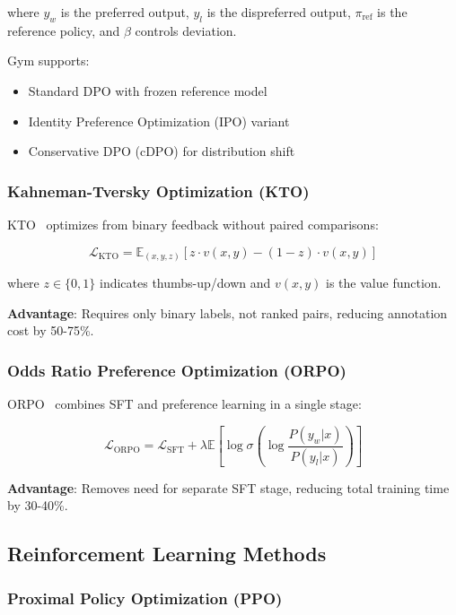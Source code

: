 where $y_w$ is the preferred output, $y_l$ is the dispreferred output, $\pi_{\text{ref}}$ is the reference policy, and $\beta$ controls deviation.

Gym supports:
\begin{itemize}
\item Standard DPO with frozen reference model
\item Identity Preference Optimization (IPO) variant
\item Conservative DPO (cDPO) for distribution shift
\end{itemize}

\subsubsection{Kahneman-Tversky Optimization (KTO)}

KTO~\citep{ethayarajh2024kto} optimizes from binary feedback without paired comparisons:

\begin{equation}
\mathcal{L}_{\text{KTO}} = \mathbb{E}_{(x,y,z)} \left[ z \cdot v(x,y) - (1-z) \cdot v(x,y) \right]
\end{equation}

where $z \in \{0, 1\}$ indicates thumbs-up/down and $v(x,y)$ is the value function.

\textbf{Advantage}: Requires only binary labels, not ranked pairs, reducing annotation cost by 50-75\%.

\subsubsection{Odds Ratio Preference Optimization (ORPO)}

ORPO~\citep{hong2024orpo} combines SFT and preference learning in a single stage:

\begin{equation}
\mathcal{L}_{\text{ORPO}} = \mathcal{L}_{\text{SFT}} + \lambda \mathbb{E} \left[ \log \sigma \left( \log \frac{P(y_w|x)}{P(y_l|x)} \right) \right]
\end{equation}

\textbf{Advantage}: Removes need for separate SFT stage, reducing total training time by 30-40\%.

\subsection{Reinforcement Learning Methods}

\subsubsection{Proximal Policy Optimization (PPO)}

